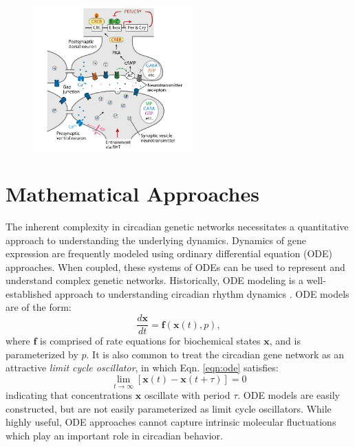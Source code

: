 \begin{figure}[htb] 
    \begin{center}
        \includegraphics[width=0.55\textwidth]{intro/figures/welsh-takahashi-kay-2010.pdf}
    \end{center}
\end{figure}

\section{Mathematical Approaches}
The inherent complexity in circadian genetic networks necessitates a quantitative approach to understanding the underlying dynamics.
Dynamics of gene expression are frequently modeled using ordinary differential equation (ODE) approaches.
When coupled, these systems of ODEs can be used to represent and understand complex genetic networks.
Historically, ODE modeling is a well-established approach to understanding circadian rhythm dynamics \cite{Leloup2003a, To2007, Rust2007, Mirsky2009b}.
ODE models are of the form:
\begin{equation}
    \label{eqn:ode}
    \frac{d\mathbf{x}}{dt} = \mathbf{f}(\mathbf{x}(t),p),
\end{equation}
where $\mathbf{f}$ is comprised of rate equations for biochemical states $\mathbf{x}$, and is parameterized by $p$.
It is also common to treat the circadian gene network as an attractive \textit{limit cycle oscillator}, in which Eqn. \ref{eqn:ode} satisfies:
\begin{equation}
    \label{eqn:lco}
    \lim_{t\to\infty} [\mathbf{x}(t) - \mathbf{x}(t+\tau)] = 0
\end{equation}
indicating that concentrations $\mathbf{x}$ oscillate with period $\tau$.
ODE models are easily constructed, but are not easily parameterized as limit cycle oscillators.
While highly useful, ODE approaches cannot capture intrinsic molecular fluctuations which play an important role in circadian behavior.

